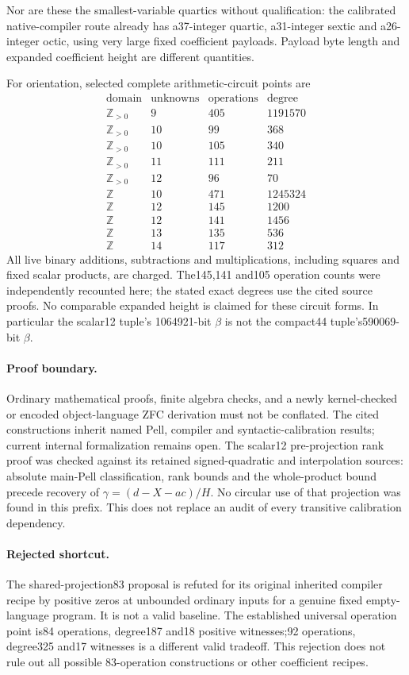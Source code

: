 Nor are these the smallest-variable quartics without qualification:
the calibrated native-compiler route already has a37-integer quartic,
a31-integer sextic and a26-integer octic, using very large fixed
coefficient payloads.  Payload byte length and expanded coefficient
height are different quantities.

For orientation, selected complete arithmetic-circuit points are
\[
\begin{array}{c|r|r|r}
\text{domain}&\text{unknowns}&\text{operations}&\text{degree}\\ \hline
\mathbb Z_{>0}&9&405&1191570\\
\mathbb Z_{>0}&10&99&368\\
\mathbb Z_{>0}&10&105&340\\
\mathbb Z_{>0}&11&111&211\\
\mathbb Z_{>0}&12&96&70\\
\mathbb Z&10&471&1245324\\
\mathbb Z&12&145&1200\\
\mathbb Z&12&141&1456\\
\mathbb Z&13&135&536\\
\mathbb Z&14&117&312
\end{array}
\]
All live binary additions, subtractions and multiplications, including
squares and fixed scalar products, are charged.  The145,141 and105
operation counts were independently recounted here; the stated exact
degrees use the cited source proofs.  No comparable expanded height is
claimed for these circuit forms.  In particular the scalar12 tuple's
1064921-bit $\beta$ is not the compact44 tuple's590069-bit $\beta$.

\paragraph{Proof boundary.}
Ordinary mathematical proofs, finite algebra checks, and a newly
kernel-checked or encoded object-language ZFC derivation must not be
conflated.  The cited constructions inherit named Pell, compiler and
syntactic-calibration results; current internal formalization remains
open.  The scalar12 pre-projection rank proof was checked against its
retained signed-quadratic and interpolation sources: absolute main-Pell
classification, rank bounds and the whole-product bound precede recovery
of $\gamma=(d-X-ac)/H$.  No circular use of that projection was found in
this prefix.  This does not replace an audit of every transitive
calibration dependency.

\paragraph{Rejected shortcut.}
The shared-projection83 proposal is refuted for its original inherited
compiler recipe by positive zeros at unbounded ordinary inputs for a
genuine fixed empty-language program.  It is not a valid baseline.
The established universal operation point is84 operations, degree187
and18 positive witnesses;92 operations, degree325 and17 witnesses is a
different valid tradeoff.  This rejection does not rule out all possible
83-operation constructions or other coefficient recipes.
